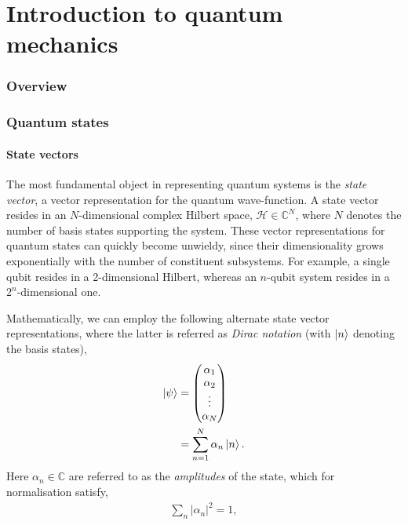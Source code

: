 \documentclass[aps,pra,twocolumn,amsmath,amssymb,nofootinbib,superscriptaddress]{revtex4}
\begin{document}
\part{Introduction to quantum mechanics}

%
%

\section{Overview}

%
%

\section{Quantum states}

%
%

\subsection{State vectors}

The most fundamental object in representing quantum systems is the \textit{state vector}, a vector representation for the quantum wave-function. A state vector resides in an $N$-dimensional complex Hilbert space, \mbox{$\mathcal{H}\in\mathbb{C}^N$}, where $N$ denotes the number of basis states supporting the system. These vector representations for quantum states can quickly become unwieldy, since their dimensionality grows exponentially with the number of constituent subsystems. For example, a single qubit resides in a 2-dimensional Hilbert, whereas an $n$-qubit system resides in a $2^n$-dimensional one.

Mathematically, we can employ the following alternate state vector representations, where the latter is referred as \textit{Dirac notation} (with $\ket{n}$ denoting the basis states),
\begin{align}
	\ket\psi &= \left(\begin{matrix}{}
	\alpha_1\\
	\alpha_2\\
	\vdots\\
	\alpha_N
\end{matrix}\right)\nonumber\\
	&= \sum_{n=1}^N \alpha_n \ket{n}.
\end{align}
Here \mbox{$\alpha_n\in\mathbb{C}$} are referred to as the \textit{amplitudes} of the state, which for normalisation satisfy,
\begin{align}\label{eq:state_norm_cond}
\sum_n |\alpha_n|^2 = 1,	
\end{align}
\end{document}
